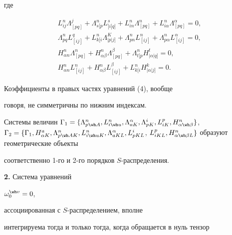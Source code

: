 где


$$


\begin{array}{c}


L^n_{ij} \Lambda^j_{[pq]}+\Lambda^n_{s[p} L^s_{|i|q]}+


L^n_{in} \Lambda^n_{[pq]}+L^n_{i \alpha} \Lambda^\alpha_{[pq]}=0, \\[2mm]


\Lambda^n_{pq} L^q_{[ij]}+L^n_{k[i} \Lambda^K_{|p|j]}+


\Lambda^n_{pn} L^n_{[ij]}+\Lambda^n_{p \alpha} L^\alpha_{[ij]}=0, \\[2mm]


H^n_{\alpha n} \Lambda^n_{[pq]}+H^n_{\alpha \beta} \Lambda^\beta_{[pq]}+


\Lambda^n_{t[p} H^t_{|\alpha |q]}=0, \\[2mm]


H^n_{\alpha n} L^n_{[ij]}+H^n_{\alpha \beta} L^\beta_{[ij]}+


L^n_{k[i} H^k_{|\alpha |j]}=0.


\end{array}


$$


Коэффициенты в правых частях уравнений (4), вообще


говоря, не симметричны по нижним индексам.





Системы величин $\Gamma_1=\{\Lambda^n_{p \wh A}, L^n_{i \wh u},


\Lambda^\alpha_{a K}, \Lambda^i_{p K}, L^p_{i K},


H^n_{\alpha \wh\beta}\}$, $\Gamma_2=\{\Gamma_1, H^a_{\alpha K},


\Lambda^n_{p \wh A K}, L^n_{i \wh u K},


\Lambda^\alpha_{a K L}, L^i_{p K L}$, $L^p_{i K L},


H^n_{\alpha \wh\beta L}\}$ образуют геометрические объекты


\cite{rab6} соответственно 1-го и 2-го порядков $S$-распределения.


\medskip





{\bf 2.} Система уравнений


$\omega^{\wh v}_0=0$,


ассоциированная \cite{rab5} с $S$-распределением, вполне


интегрируема тогда и только тогда, когда обращается в нуль тензор


